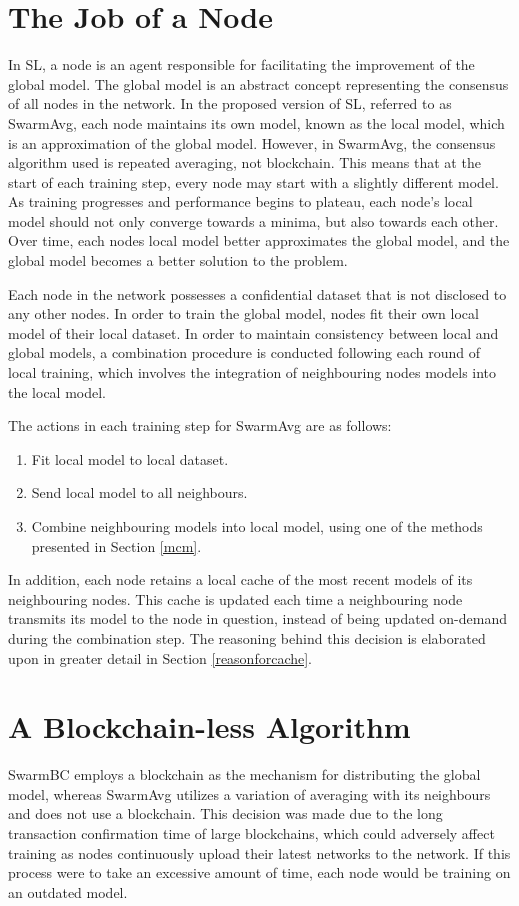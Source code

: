 \section{The Job of a Node}
In SL, a node is an agent responsible for facilitating the improvement of the global model. The global model is an abstract concept representing the consensus of all nodes in the network. In the proposed version of SL, referred to as SwarmAvg, each node maintains its own model, known as the local model, which is an approximation of the global model. However, in SwarmAvg, the consensus algorithm used is repeated averaging, not blockchain. This means that at the start of each training step, every node may start with a slightly different model. As training progresses and performance begins to plateau, each node's local model should not only converge towards a minima, but also towards each other. Over time, each nodes local model better approximates the global model, and the global model becomes a better solution to the problem.

Each node in the network possesses a confidential dataset that is not disclosed to any other nodes. In order to train the global model, nodes fit their own local model of their local dataset. In order to maintain consistency between local and global models, a combination procedure is conducted following each round of local training, which involves the integration of neighbouring nodes models into the local model.

The actions in each training step for SwarmAvg are as follows:
\begin{enumerate}
	\item Fit local model to local dataset.
	\item Send local model to all neighbours.
	\item Combine neighbouring models into local model, using one of the methods presented in Section \ref{mcm}.
\end{enumerate}

In addition, each node retains a local cache of the most recent models of its neighbouring nodes. This cache is updated each time a neighbouring node transmits its model to the node in question, instead of being updated on-demand during the combination step. The reasoning behind this decision is elaborated upon in greater detail in Section \ref{reasonforcache}.

\section{A Blockchain-less Algorithm}
SwarmBC employs a blockchain as the mechanism for distributing the global model, whereas SwarmAvg utilizes a variation of averaging with its neighbours and does not use a blockchain. This decision was made due to the long transaction confirmation time of large blockchains, which could adversely affect training as nodes continuously upload their latest networks to the network. If this process were to take an excessive amount of time, each node would be training on an outdated model.


